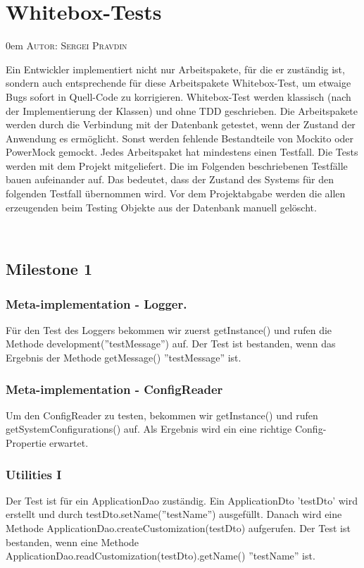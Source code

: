 \documentclass{article}
\makeatletter
\newcommand{\sectionauthor}[1]{
	{\parindent 0em \large \scshape Autor: #1 \par \nobreak \vspace*{1em}}
	\@afterheading
}
\makeatother
\begin{document}
\section{Whitebox-Tests}
\sectionauthor{Sergei Pravdin}
Ein Entwickler implementiert nicht nur Arbeitspakete, für die er zuständig ist, sondern auch entsprechende für diese Arbeitspakete Whitebox-Test, um etwaige Bugs sofort in Quell-Code zu korrigieren. Whitebox-Test werden klassisch (nach der Implementierung der Klassen) und ohne TDD geschrieben. Die Arbeitspakete werden durch die Verbindung mit der Datenbank getestet, wenn der Zustand der Anwendung es ermöglicht. Sonst werden fehlende Bestandteile von Mockito oder PowerMock gemockt. Jedes Arbeitspaket hat mindestens einen Testfall. Die Tests werden mit dem Projekt mitgeliefert. Die im Folgenden beschriebenen Testfälle bauen aufeinander auf. Das bedeutet, dass der Zustand des Systems für den folgenden Testfall übernommen wird. Vor dem Projektabgabe werden die allen erzeugenden beim Testing Objekte aus der Datenbank manuell gelöscht. 

­\subsection{Milestone 1}

\subsubsection{Meta-implementation - Logger.}
Für den Test des Loggers bekommen wir zuerst getInstance() und rufen die Methode development(''testMessage'') auf. Der Test ist bestanden, wenn das Ergebnis der Methode getMessage() ''testMessage'' ist.

\subsubsection{Meta-implementation - ConfigReader}
Um den ConfigReader zu testen, bekommen wir getInstance() und rufen getSystemConfigurations() auf. Als Ergebnis wird ein eine richtige Config-Propertie erwartet.

\subsubsection{Utilities I}
Der Test ist für ein ApplicationDao zuständig. Ein ApplicationDto 'testDto' wird erstellt und durch testDto.setName(''testName'') ausgefüllt. Danach wird eine Methode \linebreak ApplicationDao.createCustomization(testDto) aufgerufen. Der Test ist bestanden, wenn eine Methode ApplicationDao.readCustomization(testDto).getName() ''testName'' ist.
\end{document}
